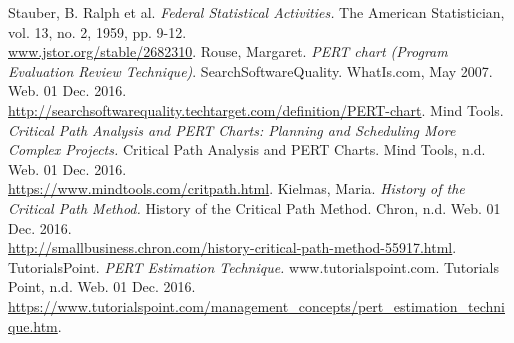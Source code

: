 \documentclass[12pt]{article}
\begin{document}
\newpage
\begin{thebibliography}{9}
  Stauber, B. Ralph et al.
  \textit{Federal Statistical Activities.}
  The American Statistician, vol. 13, no. 2, 1959, pp. 9-12. \\
  \url{www.jstor.org/stable/2682310}.
  Rouse, Margaret.
  \textit{PERT chart (Program Evaluation Review Technique)}.
  SearchSoftwareQuality. WhatIs.com, May 2007. Web. 01 Dec. 2016. \\
  \url{http://searchsoftwarequality.techtarget.com/definition/PERT-chart}.
  Mind Tools.
  \textit{Critical Path Analysis and PERT Charts: Planning and Scheduling More Complex Projects.}
  Critical Path Analysis and PERT Charts. Mind Tools, n.d. Web. 01 Dec. 2016. \\
  \url{https://www.mindtools.com/critpath.html}.
  Kielmas, Maria.
  \textit{History of the Critical Path Method.}
  History of the Critical Path Method. Chron, n.d. Web. 01 Dec. 2016. \\
  \url{http://smallbusiness.chron.com/history-critical-path-method-55917.html}.
  TutorialsPoint.
  \textit{PERT Estimation Technique.}
  www.tutorialspoint.com. Tutorials Point, n.d. Web. 01 Dec. 2016. \\
  \url{https://www.tutorialspoint.com/management_concepts/pert_estimation_technique.htm}.
\end{thebibliography}
\end{document}
